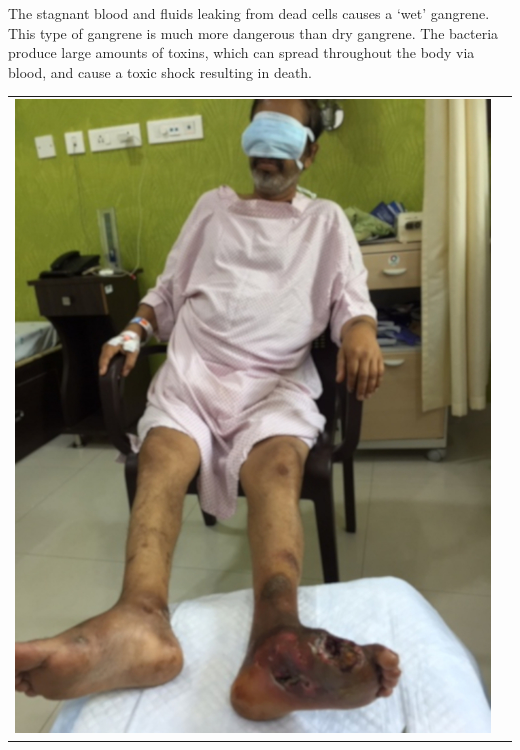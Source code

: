 The stagnant blood and fluids leaking from dead cells causes a ‘wet’ gangrene. This type of gangrene is much more dangerous than dry gangrene. The bacteria produce large amounts of toxins, which can spread throughout the body via blood, and cause a toxic shock resu\-lting in death.

\begin{center}
\begin{tabular}{@{}cc@{}}
\includegraphics[scale=1.1]{images/068.jpg} &

\end{tabular}
\end{center}
